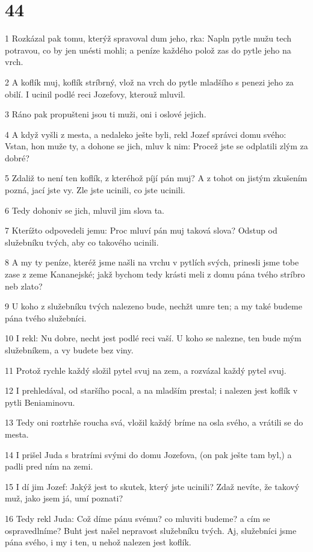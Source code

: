 \chapter{44}

\par 1 Rozkázal pak tomu, kterýž spravoval dum jeho, rka: Napln pytle mužu tech potravou, co by jen unésti mohli; a peníze každého polož zas do pytle jeho na vrch.
\par 2 A koflík muj, koflík stríbrný, vlož na vrch do pytle mladšího s penezi jeho za obilí. I ucinil podlé reci Jozefovy, kterouž mluvil.
\par 3 Ráno pak propušteni jsou ti muži, oni i oslové jejich.
\par 4 A když vyšli z mesta, a nedaleko ješte byli, rekl Jozef správci domu svého: Vstan, hon muže ty, a dohone se jich, mluv k nim: Procež jste se odplatili zlým za dobré?
\par 5 Zdaliž to není ten koflík, z kteréhož píjí pán muj? A z tohot on jistým zkušením pozná, jací jste vy. Zle jste ucinili, co jste ucinili.
\par 6 Tedy dohoniv se jich, mluvil jim slova ta.
\par 7 Kterížto odpovedeli jemu: Proc mluví pán muj taková slova? Odstup od služebníku tvých, aby co takového ucinili.
\par 8 A my ty peníze, kteréž jsme našli na vrchu v pytlích svých, prinesli jsme tobe zase z zeme Kananejské; jakž bychom tedy krásti meli z domu pána tvého stríbro neb zlato?
\par 9 U koho z služebníku tvých nalezeno bude, nechžt umre ten; a my také budeme pána tvého služebníci.
\par 10 I rekl: Nu dobre, necht jest podlé reci vaší. U koho se nalezne, ten bude mým služebníkem, a vy budete bez viny.
\par 11 Protož rychle každý složil pytel svuj na zem, a rozvázal každý pytel svuj.
\par 12 I prehledával, od staršího pocal, a na mladším prestal; i nalezen jest koflík v pytli Beniaminovu.
\par 13 Tedy oni roztrhše roucha svá, vložil každý bríme na osla svého, a vrátili se do mesta.
\par 14 I prišel Juda s bratrími svými do domu Jozefova, (on pak ješte tam byl,) a padli pred ním na zemi.
\par 15 I dí jim Jozef: Jakýž jest to skutek, který jste ucinili? Zdaž nevíte, že takový muž, jako jsem já, umí poznati?
\par 16 Tedy rekl Juda: Což díme pánu svému? co mluviti budeme? a cím se ospravedlníme? Buht jest našel nepravost služebníku tvých. Aj, služebníci jsme pána svého, i my i ten, u nehož nalezen jest koflík.
